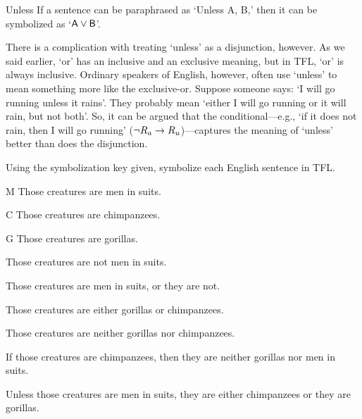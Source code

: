 \begin{factboxy}{Unless}
		If a sentence can be paraphrased as `Unless A, B,' then it can be symbolized as `$\mathsf{A}\vee\mathsf{B}$'.
\end{factboxy}

There is a complication with treating `unless' as a disjunction, however. As we said earlier, `or' has an inclusive and an exclusive meaning, but in TFL, `or' is always inclusive. Ordinary speakers of English, however, often use `unless' to mean something more like the exclusive-or. Suppose someone says: `I will go running unless it rains'. They probably mean `either I will go running or it will rain, but not both'. So, it can be argued that the conditional---e.g., `if it does not rain, then I will go running' (${\neg} R_a \rightarrow R_u$)---captures the meaning of `unless' better than does the disjunction.

\practiceproblems
\solutions
\problempart Using the symbolization key given, symbolize each English sentence in TFL.\label{pr.monkeysuits}
	\begin{ekey}
		\item[M] Those creatures are men in suits. 
		\item[C] Those creatures are chimpanzees. 
		\item[G] Those creatures are gorillas.
	\end{ekey}
\begin{earg}
\item Those creatures are not men in suits.
\item Those creatures are men in suits, or they are not.
\item Those creatures are either gorillas or chimpanzees.
\item Those creatures are neither gorillas nor chimpanzees.
\item If those creatures are chimpanzees, then they are neither gorillas nor men in suits.
\item Unless those creatures are men in suits, they are either chimpanzees or they are gorillas.
\end{earg}

